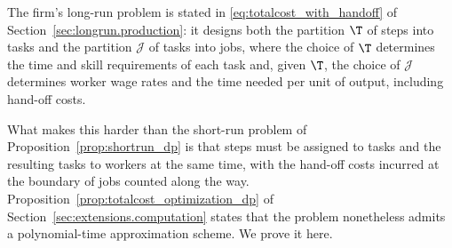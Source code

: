 The firm's long-run problem is stated in \eqref{eq:totalcost_with_handoff} of Section~\ref{sec:longrun.production}: it designs both the partition $\T$ of steps into tasks and the partition $\mathcal{J}$ of tasks into jobs, where the choice of $\T$ determines the time and skill requirements of each task and, given $\T$, the choice of $\mathcal{J}$ determines worker wage rates and the time needed per unit of output, including hand-off costs.

What makes this harder than the short-run problem of Proposition~\ref{prop:shortrun_dp} is that steps must be assigned to tasks and the resulting tasks to workers at the same time, with the hand-off costs incurred at the boundary of jobs counted along the way.
Proposition~\ref{prop:totalcost_optimization_dp} of Section~\ref{sec:extensions.computation} states that the problem nonetheless admits a polynomial-time approximation scheme.
We prove it here.

